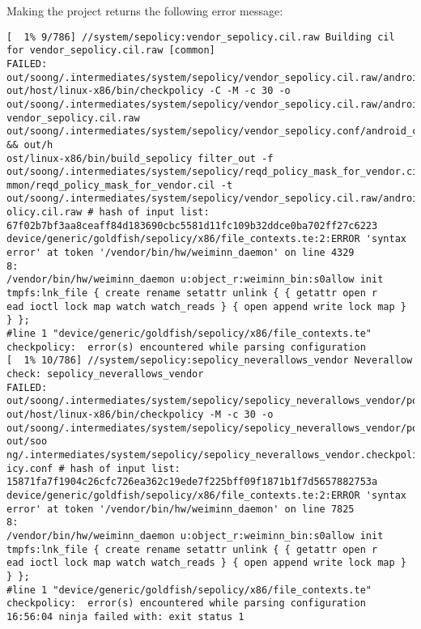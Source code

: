 Making the project returns the following error message:
\begin{lstlisting}
[  1% 9/786] //system/sepolicy:vendor_sepolicy.cil.raw Building cil for vendor_sepolicy.cil.raw [common]
FAILED: out/soong/.intermediates/system/sepolicy/vendor_sepolicy.cil.raw/android_common/vendor_sepolicy.cil.raw
out/host/linux-x86/bin/checkpolicy -C -M -c 30 -o out/soong/.intermediates/system/sepolicy/vendor_sepolicy.cil.raw/android_common/
vendor_sepolicy.cil.raw out/soong/.intermediates/system/sepolicy/vendor_sepolicy.conf/android_common/vendor_sepolicy.conf && out/h
ost/linux-x86/bin/build_sepolicy filter_out -f out/soong/.intermediates/system/sepolicy/reqd_policy_mask_for_vendor.cil/android_co
mmon/reqd_policy_mask_for_vendor.cil -t out/soong/.intermediates/system/sepolicy/vendor_sepolicy.cil.raw/android_common/vendor_sep
olicy.cil.raw # hash of input list: 67f02b7bf3aa8ceaff84d183690cbc5581d11fc109b32ddce0ba702ff27c6223
device/generic/goldfish/sepolicy/x86/file_contexts.te:2:ERROR 'syntax error' at token '/vendor/bin/hw/weiminn_daemon' on line 4329
8:
/vendor/bin/hw/weiminn_daemon u:object_r:weiminn_bin:s0allow init tmpfs:lnk_file { create rename setattr unlink { { getattr open r
ead ioctl lock map watch watch_reads } { open append write lock map } } };
#line 1 "device/generic/goldfish/sepolicy/x86/file_contexts.te"
checkpolicy:  error(s) encountered while parsing configuration
[  1% 10/786] //system/sepolicy:sepolicy_neverallows_vendor Neverallow check: sepolicy_neverallows_vendor
FAILED: out/soong/.intermediates/system/sepolicy/sepolicy_neverallows_vendor/policy
out/host/linux-x86/bin/checkpolicy -M -c 30 -o out/soong/.intermediates/system/sepolicy/sepolicy_neverallows_vendor/policy out/soo
ng/.intermediates/system/sepolicy/sepolicy_neverallows_vendor.checkpolicy.conf/android_common/sepolicy_neverallows_vendor.checkpol
icy.conf # hash of input list: 15871fa7f1904c26cfc726ea362c19ede7f225bff09f1871b1f7d5657882753a
device/generic/goldfish/sepolicy/x86/file_contexts.te:2:ERROR 'syntax error' at token '/vendor/bin/hw/weiminn_daemon' on line 7825
8:
/vendor/bin/hw/weiminn_daemon u:object_r:weiminn_bin:s0allow init tmpfs:lnk_file { create rename setattr unlink { { getattr open r
ead ioctl lock map watch watch_reads } { open append write lock map } } };
#line 1 "device/generic/goldfish/sepolicy/x86/file_contexts.te"
checkpolicy:  error(s) encountered while parsing configuration
16:56:04 ninja failed with: exit status 1
\end{lstlisting}



